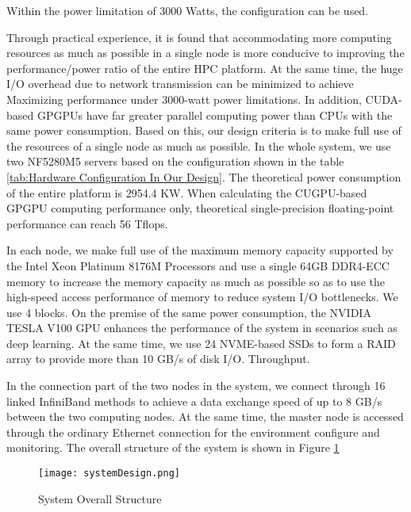 \documentclass{mcmthesis}
\begin{document}
\par Within the power limitation of 3000 Watts, the configuration can be used.

\par Through practical experience, it is found that accommodating more computing resources as much as possible in a single node is more conducive to improving the performance/power ratio of the entire HPC platform. At the same time, the huge I/O overhead due to network transmission can be minimized to achieve Maximizing performance under 3000-watt power limitations. In addition, CUDA-based GPGPUs have far greater parallel computing power than CPUs with the same power consumption. Based on this, our design criteria is to make full use of the resources of a single node as much as possible. In the whole system, we use two NF5280M5 servers based on the configuration shown in the table \ref{tab:Hardware Configuration In Our Design}. The theoretical power consumption of the entire platform is 2954.4 KW. When calculating the CUGPU-based GPGPU computing performance only, theoretical single-precision floating-point performance can reach 56 Tflops. 

\par In each node, we make full use of the maximum memory capacity supported by the Intel Xeon Platinum 8176M Processors and use a single 64GB DDR4-ECC memory to increase the memory capacity as much as possible so as to use the high-speed access performance of memory to reduce system I/O bottlenecks. We use 4 blocks. On the premise of the same power consumption, the NVIDIA TESLA V100 GPU enhances the performance of the system in scenarios such as deep learning. At the same time, we use 24 NVME-based SSDs to form a RAID array to provide more than 10 GB/s of disk I/O. Throughput.

\par In the connection part of the two nodes in the system, we connect through 16 linked InfiniBand methods to achieve a data exchange speed of up to 8 GB/s between the two computing nodes. At the same time, the master node is accessed through the ordinary Ethernet connection for the environment configure and monitoring. The overall structure of the system is shown in Figure \ref{fig:System Overall Structure}

\begin{figure}[!h]
\small
\centering
\texttt{[image: systemDesign.png]}
\caption{System Overall Structure}
\label{fig:System Overall Structure}
\end{figure}
\end{document}

